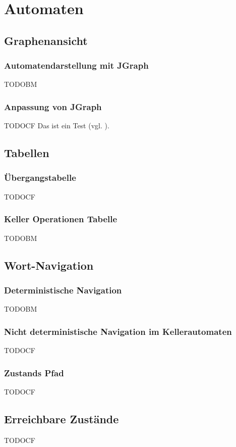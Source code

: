 

\chapter{Automaten}\label{Machines}


\section{Graphenansicht}


\subsection{Automatendarstellung mit JGraph}

TODOBM


\subsection{Anpassung von JGraph}

TODOCF Das ist ein Test (vgl. \cite{Sieber0}).


\section{Tabellen}


\subsection{Übergangstabelle}

TODOCF


\subsection{Keller Operationen Tabelle}

TODOBM


\section{Wort-Navigation}


\subsection{Deterministische Navigation}

TODOBM


\subsection{Nicht deterministische Navigation im Kellerautomaten}

TODOCF


\subsection{Zustands Pfad}

TODOCF


\section{Erreichbare Zustände}\label{ReachableStates}

TODOCF